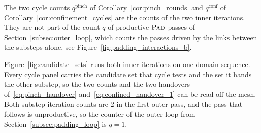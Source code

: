 \documentclass[a4paper, 12pt]{article}
\theoremstyle{definition}
\theoremstyle{plain}
\numberwithin{equation}{section}
\begin{document}
The two cycle counts $q^{\mathrm{pinch}}$ of Corollary~\ref{cor:pinch_rounds} and $q^{\mathrm{conf}}$ of Corollary~\ref{cor:confinement_cycles} are the counts of the two inner iterations. They are not part of the count $q$ of productive $\textsc{Pad}$ passes of Section~\ref{subsec:outer_loop}, which counts the passes driven by the links between the substeps alone, see Figure~\ref{fig:padding_interactions_b}.

Figure~\ref{fig:candidate_sets} runs both inner iterations on one domain sequence. Every cycle panel carries the candidate set that cycle tests and the set it hands the other substep, so the two counts and the two handovers of~\eqref{eq:pinch_handover} and~\eqref{eq:confined_handover_1} can be read off the mesh. Both substep iteration counts are $2$ in the first outer pass, and the pass that follows is unproductive, so the counter of the outer loop from Section~\ref{subsec:padding_loop} is $q = 1$.

\newlength{\candside}
\setlength{\candside}{4.3cm}
\newlength{\candtrim}
\setlength{\candtrim}{2.075cm}
\newcommand{\candvgap}{1.45}
\newcommand{\candgapin}{-0.5}  %
\newcommand{\candgapmid}{0.4}  %
\newcommand{\candgapout}{-0.5} %
\newcommand{\candleggap}{-0.7} %
\newcommand{\candhandreach}{0} %
\newcommand{\candhandlabpos}{0.55} %
\newcommand{\candhandlabsep}{0.3275} %
\newcommand{\candbox}{0}      %

\end{document}
